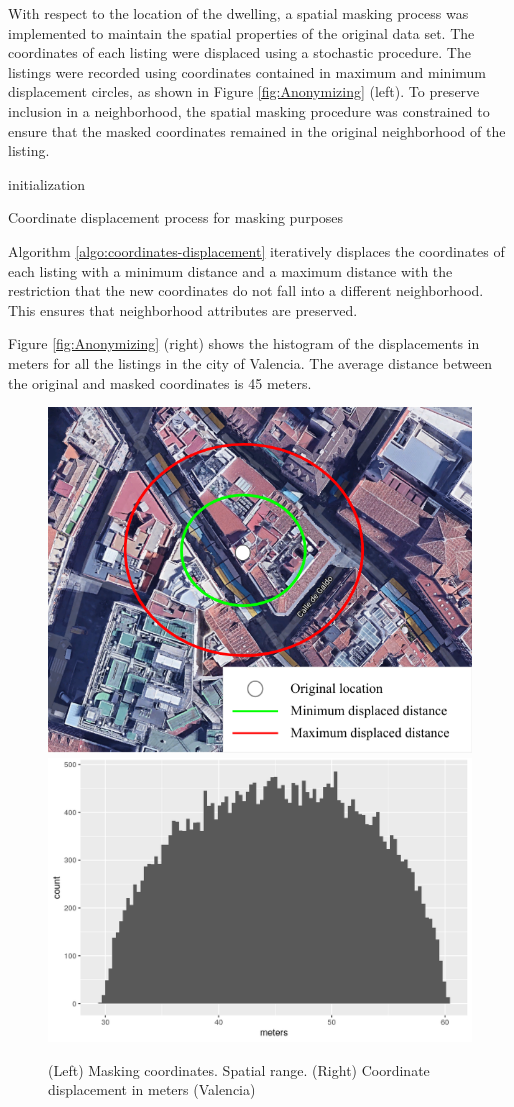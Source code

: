 \documentclass[Royal,times,sageh]{sagej}
\begin{document}
With respect to the location of the dwelling, a spatial masking process
was implemented to maintain the spatial properties of the original data
set. The coordinates of each listing were displaced using a stochastic
procedure. The listings were recorded using coordinates contained in
maximum and minimum displacement circles, as shown in Figure
\ref{fig:Anonymizing} (left). To preserve inclusion in a neighborhood,
the spatial masking procedure was constrained to ensure that the masked
coordinates remained in the original neighborhood of the listing.

\begin{algorithm}[!ht]
 initialization\;
 \caption{Coordinate displacement process for masking purposes}
 \label{algo:coordinates-displacement}
\end{algorithm}

Algorithm \ref{algo:coordinates-displacement} iteratively displaces the
coordinates of each listing with a minimum distance and a maximum
distance with the restriction that the new coordinates do not fall into
a different neighborhood. This ensures that neighborhood attributes are
preserved.

Figure \ref{fig:Anonymizing} (right) shows the histogram of the
displacements in meters for all the listings in the city of Valencia.
The average distance between the original and masked coordinates is 45
meters.

\begin{figure}

{\centering \includegraphics[width=0.29\linewidth,height=0.2\textheight]{main_EPB_figures/points-moved-image} \includegraphics[width=0.37\linewidth,height=0.2\textheight]{main_EPB_figures/coordinates-valencia} 

}

\caption{\label{fig:Anonymizing}(Left) Masking coordinates. Spatial range. (Right) Coordinate displacement in meters (Valencia)}\label{fig:figure-masking-coordinates}
\end{figure}
\end{document}
